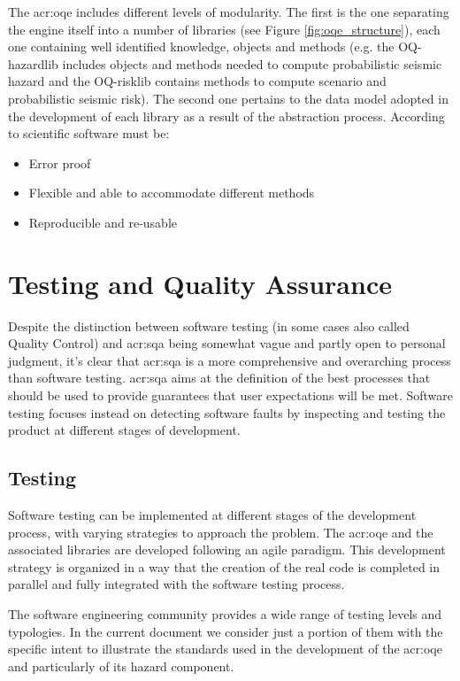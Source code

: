 % 
The \gls{acr:oqe} includes different levels of modularity. 
The first is the one separating the engine itself into a number of 
libraries (see Figure \ref{fig:oqe_structure}), each one containing well 
identified knowledge, objects and methods (e.g. the OQ-hazardlib  
includes objects and methods needed to compute probabilistic 
seismic hazard and the OQ-risklib contains methods to compute scenario 
and probabilistic seismic risk). 
% 
The second one pertains to the data model adopted in the development 
of each library as a result of the abstraction process.
%
According to \textcite{berkes2012} scientific software must be:
\begin{itemize}
\item Error proof
\item Flexible and able to accommodate different methods
\item Reproducible and re-usable
\end{itemize}
%
\section{Testing and Quality Assurance}
Despite the distinction between software testing (in some cases also called 
Quality Control) and \gls{acr:sqa} being somewhat vague and partly open to personal 
judgment, it's clear that \gls{acr:sqa} is a more comprehensive and 
overarching process than software testing. 
%
\gls{acr:sqa} aims at the definition of the best processes  
that should be used to provide guarantees that user expectations will 
be met. 
% 
Software testing focuses instead on detecting software faults by inspecting 
and testing the product at different stages of development.
%
\subsection{Testing}
Software testing can be implemented at different stages of the development 
process, with varying strategies to approach the problem.
%
The \gls{acr:oqe} and the associated libraries are developed following an 
agile paradigm. This development strategy is organized in a way that 
the creation of the real code is completed in parallel and fully 
integrated with the software testing process.

The software engineering community provides a wide range of testing levels
and typologies. In the current document we consider just a portion of them
with the specific intent to illustrate the standards used in the 
development of the \gls{acr:oqe} and particularly of its hazard component.
%
